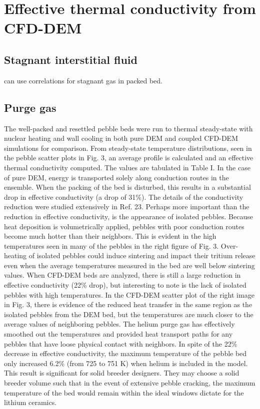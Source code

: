 \section{Effective thermal conductivity from CFD-DEM}\label{sec:cfd-dem-effective-conductivity}

\subsection{Stagnant interstitial fluid}
can use correlations for stagnant gas in packed bed.



\subsection{Purge gas}
The well-packed and resettled pebble beds were run to thermal steady-state with nuclear heating and wall cooling in both pure DEM and coupled CFD-DEM simulations for comparison. From steady-state temperature distributions, seen in the pebble scatter plots in Fig. 3, an average profile is calculated and an effective thermal conductivity computed. The values are tabulated in Table I. 
In the case of pure DEM, energy is transported solely along conduction routes in the ensemble. When the packing of the bed is disturbed, this results in a substantial drop in effective conductivity (a drop of 31\%). The details of the conductivity reduction were studied extensively in Ref. 23. Perhaps more important than the reduction in effective conductivity, is the appearance of isolated pebbles. Because heat deposition is volumetrically applied, pebbles with poor conduction routes become much hotter than their neighbors. This is evident in the high temperatures seen in many of the pebbles in the right figure of Fig. 3. Over-heating of isolated pebbles could induce sintering and impact their tritium release even when the average temperatures measured in the bed are well below sintering values.
When CFD-DEM beds are analyzed, there is still a large reduction in effective conductivity (22\% drop), but interesting to note is the lack of isolated pebbles with high temperatures. In the CFD-DEM scatter plot of the right image in Fig. 3, there is evidence of the reduced heat transfer in the same region as the isolated pebbles from the DEM bed, but the temperatures are much closer to the average values of neighboring pebbles. The helium purge gas has effectively smoothed out the temperatures and provided heat transport paths for any pebbles that have loose physical contact with neighbors.
In spite of the 22\% decrease in effective conductivity, the maximum temperature of the pebble bed only increased 6.2\% (from 725 to 751 K) when helium is included in the model. This result is significant for solid breeder designers. They may choose a solid breeder volume such that in the event of extensive pebble cracking, the maximum temperature of the bed would remain within the ideal windows dictate for the lithium ceramics.

